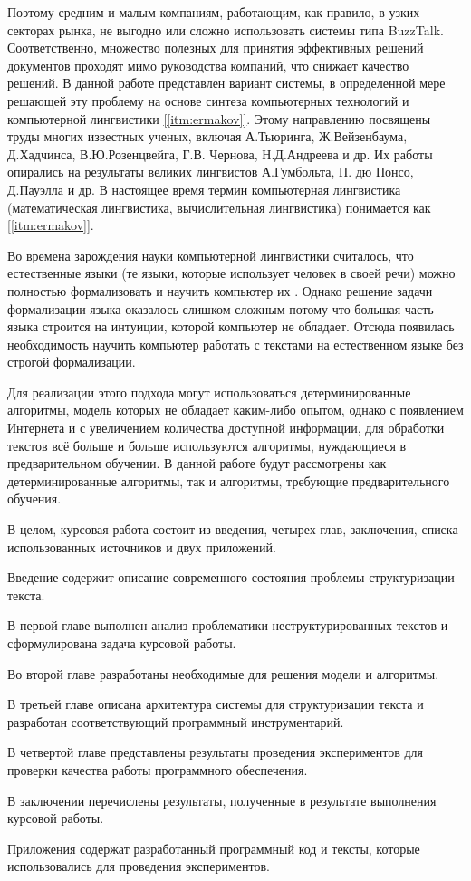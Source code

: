Поэтому средним и малым компаниям, работающим, как правило, в узких секторах рынка, не выгодно или сложно использовать системы типа BuzzTalk. Соответственно, множество полезных для принятия эффективных решений документов проходят мимо руководства компаний, что снижает качество решений.
В данной работе представлен вариант системы, в определенной мере решающей эту проблему на основе синтеза компьютерных технологий и компьютерной лингвистики \hyperref[itm:ermakov]{[\ref{itm:ermakov}]}. Этому направлению посвящены труды многих известных ученых, включая А.Тьюринга, Ж.Вейзенбаума,  Д.Хадчинса, В.Ю.Розенцвейга, Г.В. Чернова, Н.Д.Андреева и др. Их работы опирались на результаты великих лингвистов А.Гумбольта, П. дю Понсо, Д.Пауэлла и др.    
В настоящее время термин компьютерная лингвистика (математическая лингвистика, вычислительная лингвистика) понимается как  \hyperref[itm:ermakov]{[\ref{itm:ermakov}]}.

Во времена зарождения науки компьютерной лингвистики считалось, что естественные языки (те языки, которые использует человек в своей речи) можно полностью формализовать и научить компьютер их . Однако решение задачи формализации языка оказалось слишком сложным потому что большая часть языка строится на интуиции, которой компьютер не обладает. Отсюда появилась необходимость научить компьютер работать с текстами на естественном языке без строгой формализации.

Для реализации этого подхода могут использоваться детерминированные алгоритмы, модель которых не обладает каким-либо опытом, однако с появлением Интернета и с увеличением количества доступной информации, для обработки текстов всё больше и больше используются алгоритмы, нуждающиеся в предварительном обучении. В данной работе будут рассмотрены как детерминированные алгоритмы, так и алгоритмы, требующие предварительного обучения.

В целом, курсовая работа состоит из введения, четырех глав, заключения, списка использованных источников и двух приложений.

Введение содержит описание современного состояния проблемы структуризации текста.

В первой главе выполнен анализ проблематики неструктурированных текстов и сформулирована задача курсовой работы. 

Во второй главе разработаны необходимые для решения модели и алгоритмы.

В третьей главе описана архитектура системы для структуризации текста и разработан соответствующий программный инструментарий.

В четвертой главе представлены результаты проведения экспериментов для проверки качества работы программного обеспечения.

В заключении перечислены результаты, полученные в результате выполнения курсовой работы.

Приложения содержат разработанный программный код и тексты, которые использовались для проведения экспериментов.

\newpage
